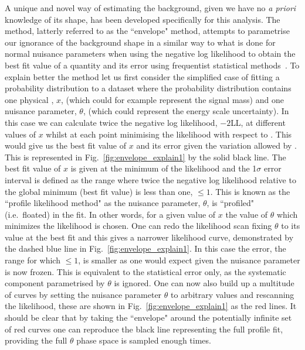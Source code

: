 A unique and novel way of estimating the background, given we have no \emph{a priori} knowledge of its shape, has been developed specifically for this analysis. The method, latterly referred to as the ``envelope" method, attempts to parametrise our ignorance of the background shape in a similar way to what is done for normal nuisance parameters when using the negative log likelihood to obtain the best fit value of a quantity and its error using frequentist statistical methods~\cite{FredJames}. To explain better the method let us first consider the simplified case of fitting a probability distribution to a dataset where the probability distribution contains one physical \POI, $x$, (which could for example represent the signal mass) and one nuisance parameter, $\theta$, (which could represent the energy scale uncertainty). In this case we can calculate twice the negative log likelihood, $-2$LL, at different values of $x$ whilst at each point minimising the likelihood with respect to \theta. 
This would give us the best fit value of $x$ and its error given the variation allowed by \theta. This is represented in Fig.~\ref{fig:envelope_explain1} by the solid black line. The best fit value of $x$ is given at the minimum of the likelihood and the 1$\sigma$ error interval is defined as the range where twice the negative log likelihood relative to the global minimum (best fit value) is less than one, \NLL$\leq1$. This is known as the ``profile likelihood method" as the nuisance parameter, $\theta$, is ``profiled" (i.e.\ floated) in the fit. In other words, for a given value of $x$ the value of $\theta$ which minimizes the likelihood is chosen. One can redo the likelihood scan fixing $\theta$ to its value at the best fit and this gives a narrower likelihood curve, demonstrated by the dashed blue line in Fig.~\ref{fig:envelope_explain1}. In this case the error, the range for which \NLL$\leq1$, is smaller as one would expect given the nuisance parameter is now frozen. This is equivalent to the statistical error only, as the systematic component parametrised by $\theta$ is ignored. One can now also build up a multitude of curves by setting the nuisance parameter $\theta$ to arbitrary values and rescanning the likelihood, these are shown in Fig.~\ref{fig:envelope_explain1} as the red lines. It should be clear that by taking the ``envelope" around the potentially infinite set of red curves one can reproduce the black line representing the full profile fit, providing the full $\theta$ phase space is sampled enough times. 
